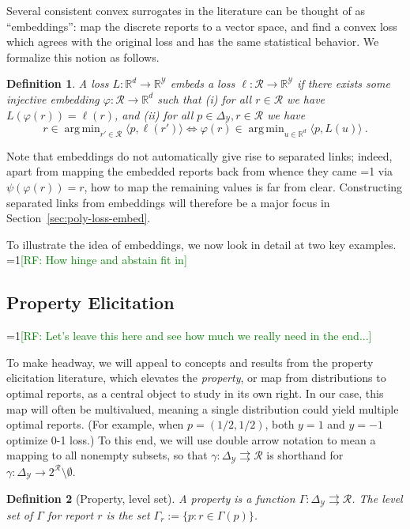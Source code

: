 \documentclass[12pt]{article}
\newcommand{\Comments}{1}
\newcommand{\mynote}[2]{\ifnum\Comments=1\textcolor{#1}{#2}\fi}
\newcommand{\mytodo}[2]{\ifnum\Comments=1%
  \todo[linecolor=#1!80!black,backgroundcolor=#1,bordercolor=#1!80!black]{#2}\fi}
\newcommand{\raf}[1]{\mynote{green}{[RF: #1]}}
\newcommand{\raft}[1]{\mytodo{green!20!white}{RF: #1}}
\newcommand{\reals}{\mathbb{R}}
\newcommand{\simplex}{\Delta_\Y}
\newcommand{\R}{\mathcal{R}}
\newcommand{\Y}{\mathcal{Y}}
\newcommand{\inprod}[2]{\langle #1, #2 \rangle}%
\newcommand{\toto}{\rightrightarrows}
\DeclareMathOperator*{\argmin}{arg\,min}
\newtheorem{definition}{Definition}
\begin{document}
Several consistent convex surrogates in the literature can be thought of as ``embeddings'': map the discrete reports to a vector space, and find a convex loss which agrees with the original loss and has the same statistical behavior.
We formalize this notion as follows.
%
\begin{definition}\label{def:loss-embed}
  A loss $L:\reals^d\to\reals^\Y$ \emph{embeds} a loss $\ell:\R\to\reals^\Y$ if there exists some injective embedding $\varphi:\R\to\reals^d$ such that
  (i) for all $r\in\R$ we have $L(\varphi(r)) = \ell(r)$, and (ii) for all $p\in\simplex,r\in\R$ we have
  \begin{equation}\label{eq:embed-loss}
    r \in \argmin_{r'\in\R} \inprod{p}{\ell(r')} \iff \varphi(r) \in \argmin_{u\in\reals^d} \inprod{p}{L(u)}~.
  \end{equation}
\end{definition}
%
Note that embeddings do not automatically give rise to separated links; indeed, apart from mapping the embedded reports back from whence they came \raft{I know... just wanted to say that} via $\psi(\varphi(r)) = r$, how to map the remaining values is far from clear.
Constructing separated links from embeddings will therefore be a major focus in Section~\ref{sec:poly-loss-embed}.

To illustrate the idea of embeddings, we now look in detail at two key examples.
\raf{How hinge and abstain fit in}

\subsection{Property Elicitation}

\raf{Let's leave this here and see how much we really need in the end...}

To make headway, we will appeal to concepts and results from the property elicitation literature, which elevates the \emph{property}, or map from distributions to optimal reports, as a central object to study in its own right.
In our case, this map will often be multivalued, meaning a single distribution could yield multiple optimal reports.
(For example, when $p=(1/2,1/2)$, both $y=1$ and $y=-1$ optimize 0-1 loss.)
To this end, we will use double arrow notation to mean a mapping to all nonempty subsets, so that $\gamma: \simplex \toto \R$ is shorthand for $\gamma: \simplex \to 2^{\R} \setminus \emptyset$.

\begin{definition}[Property, level set]\label{def:property}
  A \emph{property} is a function $\Gamma:\simplex\toto\R$.
  The \emph{level set} of $\Gamma$ for report $r$ is the set $\Gamma_r := \{p : r \in \Gamma(p)\}$.
\end{definition}
\end{document}
